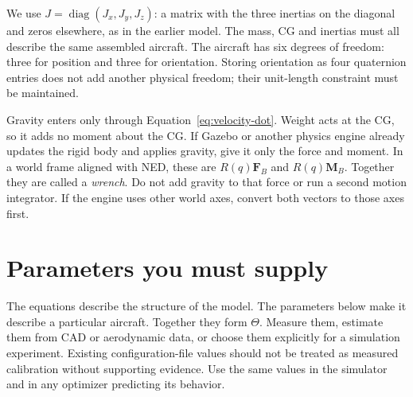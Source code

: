 \documentclass[11pt,a4paper]{article}
\numberwithin{equation}{section}
\newcommand{\vect}[1]{\boldsymbol{#1}}
\begin{document}
We use $J=\operatorname{diag}(J_x,J_y,J_z)$: a matrix with the three
inertias on the diagonal and zeros elsewhere, as in the earlier model.
The mass, CG and
inertias must all describe the same assembled aircraft.
The aircraft has six degrees of freedom: three for position and three for
orientation. Storing orientation as four quaternion entries does not add
another physical freedom; their unit-length constraint must be maintained.

Gravity enters only through Equation~\eqref{eq:velocity-dot}. Weight acts
at the CG, so it adds no moment about the CG.
If Gazebo or another physics engine already updates the rigid body and
applies gravity, give it only the force and moment. In a world frame aligned
with NED, these are $R(q)\vect F_B$ and $R(q)\vect M_B$.
Together they are called a \emph{wrench}. Do not add gravity to that force
or run a second motion integrator. If the engine uses other world axes,
convert both vectors to those axes first.

\section{Parameters you must supply}
The equations describe the structure of the model. The parameters below
make it describe a particular aircraft. Together they form $\Theta$.
Measure them, estimate them from CAD or aerodynamic data, or choose them
explicitly for a simulation experiment. Existing configuration-file values
should not be treated as measured calibration without supporting evidence.
Use the same values in the simulator and in any optimizer predicting its
behavior.
\end{document}
